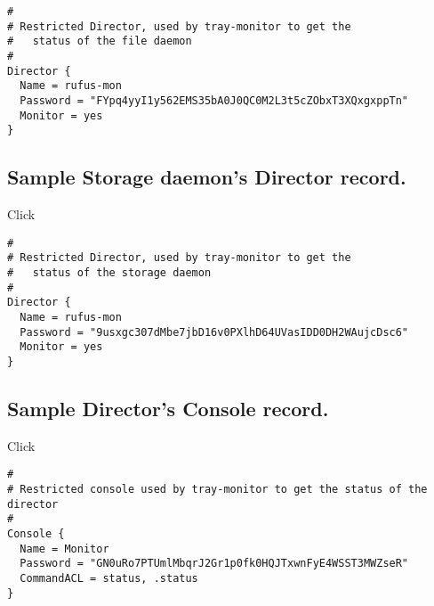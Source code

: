 \footnotesize
\begin{verbatim}
#
# Restricted Director, used by tray-monitor to get the
#   status of the file daemon
#
Director {
  Name = rufus-mon
  Password = "FYpq4yyI1y562EMS35bA0J0QC0M2L3t5cZObxT3XQxgxppTn"
  Monitor = yes
}
\end{verbatim}
\normalsize

\subsection{Sample Storage daemon's Director record.}

Click

\footnotesize
\begin{verbatim}
#
# Restricted Director, used by tray-monitor to get the
#   status of the storage daemon
#
Director {
  Name = rufus-mon
  Password = "9usxgc307dMbe7jbD16v0PXlhD64UVasIDD0DH2WAujcDsc6"
  Monitor = yes
}
\end{verbatim}
\normalsize

\subsection{Sample Director's Console record.}

Click

\footnotesize
\begin{verbatim}
#
# Restricted console used by tray-monitor to get the status of the director
#
Console {
  Name = Monitor
  Password = "GN0uRo7PTUmlMbqrJ2Gr1p0fk0HQJTxwnFyE4WSST3MWZseR"
  CommandACL = status, .status
}
\end{verbatim}
\normalsize
